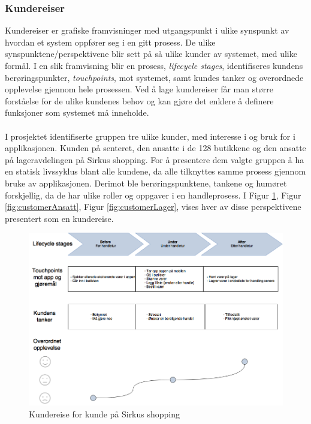 \subsubsection{Kundereiser}
\label{sec:kundereise}
Kundereiser er grafiske framvisninger med utgangspunkt i ulike synspunkt av hvordan et system oppfører seg i en gitt prosess\cite{servicedesign}. De ulike synspunktene/perspektivene blir sett på så ulike kunder av systemet, med ulike formål. I en slik framvisning blir en prosess, \textit{lifecycle stages}, identifiseres kundens berøringspunkter, \textit{touchpoints}, mot systemet, samt kundes tanker og overordnede opplevelse gjennom hele prosessen. Ved å lage kundereiser får man større forståelse for de ulike kundenes behov og kan gjøre det enklere å definere funksjoner som systemet må inneholde\cite{servicedesign}.
\\\\
I prosjektet identifiserte gruppen tre ulike kunder, med interesse i og bruk for i applikasjonen. Kunden på senteret, den ansatte i de 128 butikkene og den ansatte på lageravdelingen på Sirkus shopping. For å presentere dem valgte gruppen å ha en statisk livssyklus blant alle kundene, da alle tilknyttes samme prosess gjennom bruke av applikasjonen. Derimot ble berøringspunktene, tankene og humøret forskjellig, da de har ulike roller og oppgaver i en handleprosess. I Figur \ref{fig:customerKunde}, Figur \ref{fig:customerAnsatt}, Figur  \ref{fig:customerLager}, vises hver av disse perspektivene presentert som en kundereise. 

\begin{figure}[H]
\includegraphics[scale=0.4]{images/customerjourneyBlueprint/cjKunde}
\centering %
\caption{Kundereise for kunde på Sirkus shopping}
\label{fig:customerKunde}
\end{figure}

